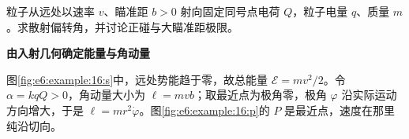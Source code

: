 \begin{question}\begin{example}[同号库仑散射的偏转角]\label{e6:example:16}
粒子从远处以速率 $v$、瞄准距 $b>0$ 射向固定同号点电荷 $Q$，粒子电量 $q$、质量 $m$。求散射偏转角，并讨论正碰与大瞄准距极限。
\end{example}
\end{question}
\begin{solution}\textbf{由入射几何确定能量与角动量}\par\nobreak
图\ref{fig:e6:example:16:s}中，远处势能趋于零，故总能量
$\mathcal E=mv^2/2$。令 $\alpha=kqQ>0$，角动量大小为
$\ell=mvb$；取最近点为极角零，极角 $\varphi$ 沿实际运动方向增大，于是
$\ell=mr^2\dot\varphi$。图\ref{fig:e6:example:16:p}的 $P$ 是最近点，速度在那里纯沿切向。


\end{solution}
